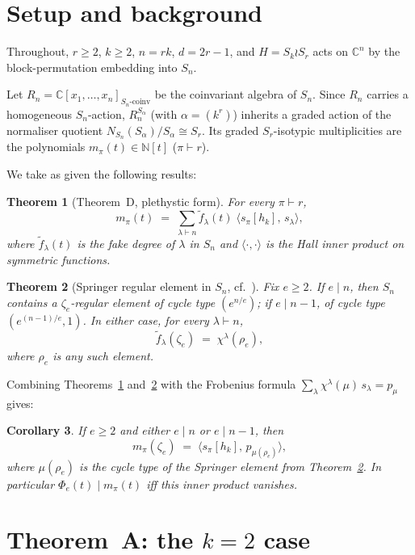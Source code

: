 \documentclass[11pt]{article}
\newtheorem{theorem}{Theorem}
\newtheorem{corollary}[theorem]{Corollary}
\theoremstyle{plain}
\theoremstyle{definition}
\theoremstyle{remark}
\newcommand{\fdeg}{\widetilde{f}}
\newcommand{\NN}{\mathbb{N}}
\newcommand{\CC}{\mathbb{C}}
\begin{document}
\section{Setup and background}

Throughout, $r \ge 2$, $k \ge 2$, $n = rk$, $d = 2r - 1$, and $H = S_k \wr S_r$
acts on $\CC^n$ by the block-permutation embedding into $S_n$.

Let $R_n = \CC[x_1, \ldots, x_n]_{S_n\text{-coinv}}$ be the coinvariant algebra
of $S_n$.  Since $R_n$ carries a homogeneous $S_n$-action, $R_n^{S_\alpha}$
(with $\alpha = (k^r)$) inherits a graded action of the normaliser quotient
$N_{S_n}(S_\alpha) / S_\alpha \cong S_r$.  Its graded $S_r$-isotypic
multiplicities are the polynomials $m_\pi(t) \in \NN[t]$ ($\pi \vdash r$).

We take as given the following results:

\begin{theorem}[Theorem~D, plethystic form]\label{thm:D}
For every $\pi \vdash r$,
\[
m_\pi(t) \;=\; \sum_{\lambda \vdash n} \fdeg_\lambda(t) \;\langle s_\pi[h_k],\, s_\lambda\rangle,
\]
where $\fdeg_\lambda(t)$ is the fake degree of $\lambda$ in $S_n$ and
$\langle \cdot, \cdot\rangle$ is the Hall inner product on symmetric functions.
\end{theorem}

\begin{theorem}[Springer regular element in $S_n$, cf.\ {\cite[\S4]{Springer1974}}]\label{thm:springer}
Fix $e \ge 2$.  If $e \mid n$, then $S_n$ contains a $\zeta_e$-regular element
of cycle type $(e^{n/e})$; if $e \mid n - 1$, of cycle type $(e^{(n-1)/e}, 1)$.
In either case, for every $\lambda \vdash n$,
\[
\fdeg_\lambda(\zeta_e) \;=\; \chi^\lambda(\rho_e),
\]
where $\rho_e$ is any such element.
\end{theorem}

Combining Theorems~\ref{thm:D} and~\ref{thm:springer} with the Frobenius formula
$\sum_\lambda \chi^\lambda(\mu)\, s_\lambda = p_\mu$ gives:

\begin{corollary}\label{cor:springer-molien}
If $e \ge 2$ and either $e \mid n$ or $e \mid n - 1$, then
\[
m_\pi(\zeta_e) \;=\; \langle s_\pi[h_k],\, p_{\mu(\rho_e)}\rangle,
\]
where $\mu(\rho_e)$ is the cycle type of the Springer element from
Theorem~\ref{thm:springer}.  In particular $\Phi_e(t) \mid m_\pi(t)$ iff this
inner product vanishes.
\end{corollary}

\section{Theorem~A: the $k = 2$ case}
\end{document}
